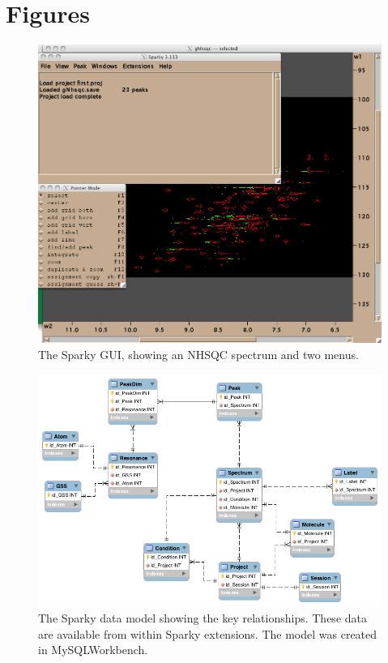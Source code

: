 \section{Figures}

\begin{figure}[h]
  \includegraphics[scale=0.4]{figures/sparky_gui}
  \caption{The Sparky GUI, showing an NHSQC spectrum and two menus.}
  \label{sparky_gui}
\end{figure}

\begin{figure}
  \includegraphics[scale=0.5]{figures/sparky_model}
  \caption[The Sparky data model]
          {The Sparky data model showing the key relationships.
           These data are available from within Sparky extensions.
           The model was created in MySQLWorkbench.}
  \label{sparky_model}
\end{figure}

